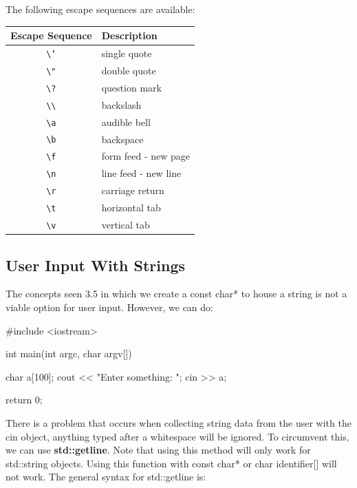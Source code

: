 \documentclass{report}
\begin{document}
    The following escape sequences are available:
    \begin{center}
    \begin{tabular}{|c|l|}
        \hline
        \textbf{Escape Sequence} & \textbf{Description} \\
        \hline
        \texttt{\textbackslash'} & single quote \\
        \texttt{\textbackslash"} & double quote \\
        \texttt{\textbackslash?} & question mark \\
        \texttt{\textbackslash\textbackslash} & backslash \\
        \texttt{\textbackslash a} & audible bell \\
        \texttt{\textbackslash b} & backspace \\
        \texttt{\textbackslash f} & form feed - new page \\
        \texttt{\textbackslash n} & line feed - new line \\
        \texttt{\textbackslash r} & carriage return \\
        \texttt{\textbackslash t} & horizontal tab \\
        \texttt{\textbackslash v} & vertical tab \\
        \hline
        \end{tabular}
    \end{center}


    \pagebreak \bigbreak \noindent 
    \subsection{User Input With Strings}
    \bigbreak \noindent 
    \begin{remark}
        The concepts seen 3.5 in which we create a const char* to house a string is not a viable option for user input. However, we can do:
    \end{remark}

        \bigbreak \noindent 
        
        \begin{cppcode}
#include <iostream>

int main(int argc, char argv[]){

    char a[100];
    cout << "Enter something: ";
    cin >> a;

    return 0;
}
        \end{cppcode}
        
    \bigbreak \noindent 
    \bigbreak \noindent 
    There is a problem that occurs when collecting string data from the user with the cin object, anything typed after a whitespace will be ignored. To circumvent this, we can use \textbf{std::getline}. Note that using this method will only work for std::string objects. Using this function with const char* or char identifier[] will not work.
    \bigbreak \noindent 
    The general syntax for std::getline is:
    \smallbreak \noindent
    
\end{document}

